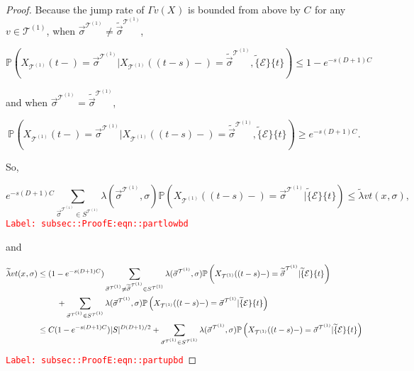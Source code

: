 \documentclass[12pt]{article}
\newcommand{\mb}{\mathbb}
\newcommand{\mc}{\mathcal}
\newcommand{\tr}{\textcolor{red}}
\newcommand{\labe}[1]{\tr{\texttt{Label: #1}}}
\newcommand{\pr}{\mb{P}}							%
\renewcommand{\v}{v}							%
\renewcommand{\S}{S}							%
\newcommand{\s}{\sigma}							%
\newcommand{\sv}{\vec{\s}}						%
\newcommand{\x}{x}								%
\renewcommand{\t}{t}							%
\renewcommand{\tt}{s}							%
\newcommand{\X}{X}								%
\newcommand{\carp}[1]{^{#1}}					%
\newcommand{\vsi}[1]{^{#1}}						%
\newcommand{\cind}[1]{_{#1}}					%
\newcommand{\tp}[1]{(#1)}						%
\newcommand{\tip}[1]{#1}						%
\newcommand{\const}{C}							%
\newcommand{\degr}{D}							%
\newcommand{\tree}{\mc{T}}						%
\newcommand{\sln}[1]{^{(#1)}}					%
\newcommand{\rate}{\lambda}						%
\newcommand{\alt}[1]{\widetilde{#1}}			%
\newcommand{\indx}[1]{_{#1}}					%
\newcommand{\evnt}{\mc{E}}						%
\newcommand{\pmap}{\Gamma}						%
\newcommand{\crate}{\alt{\lambda}}				%
\begin{document}
\begin{proof}
Because the jump rate of \(\pmap{\v}(\X\cind{}\tip{})\) is bounded from above by \(\const\indx{}\) for any \(\v\in\tree\sln{1}\),  when \(\sv\cind{}\vsi{\tree\sln{1}}\neq\alt{\sv}\cind{}\vsi{\tree\sln{1}}\), 

\[\pr\left(\X\cind{\tree\sln{1}}\tp{\t-} = \sv\cind{}\vsi{\tree\sln{1}}|\X\cind{\tree\sln{1}}\tp{(\t-\tt)-}=\alt{\sv}\cind{}\vsi{\tree\sln{1}},\alt\{\evnt\}\{\t\}\right) \leq 1-e^{-\tt(\degr+1)\const\indx{}}\]

and when \(\sv\cind{}\vsi{\tree\sln{1}}=\alt{\sv}\cind{}\vsi{\tree\sln{1}}\),

\[\pr\left(\X\cind{\tree\sln{1}}\tp{\t-} = \sv\cind{}\vsi{\tree\sln{1}}|\X\cind{\tree\sln{1}}\tp{(\t-\tt)-}=\alt{\sv}\cind{}\vsi{\tree\sln{1}},\alt\{\evnt\}\{\t\}\right) \geq e^{-\tt(\degr+1)\const\indx{}}.\]

So,

\begin{equation}
e^{-\tt(\degr+1)\const\indx{}}\sum_{\sv\cind{}\vsi{\tree\sln{1}}\in \S\carp{\tree\sln{1}}} \rate{}(\sv\cind{}\vsi{\tree\sln{1}},\s)\pr\left(\X\cind{\tree\sln{1}}\tp{(\t-\tt)-}=\sv\cind{}\vsi{\tree\sln{1}}|\alt\{\evnt\}\{\t\}\right) \leq \crate{\v}{\t}(\x\cind{}\tip{},\s),
\label{subsec::ProofE:eqn::partlowbd}
\end{equation}
\labe{subsec::ProofE:eqn::partlowbd}

and

\begin{align}
\crate{\v}{\t}(\x\cind{}\tip{},\s)&\leq (1 - e^{-\tt(\degr+1)\const\indx{}})\sum_{\sv\cind{}\vsi{\tree\sln{1}}\neq \alt{\sv}\cind{}\vsi{\tree\sln{1}} \in \S\carp{\tree\sln{1}}} \rate{}(\sv\cind{}\vsi{\tree\sln{1}},\s)\pr\left(\X\cind{\tree\sln{1}}\tp{(\t-\tt)-}=\alt{\sv}\cind{}\vsi{\tree\sln{1}}|\alt\{\evnt\}\{\t\}\right)\nonumber\\
&\hspace{24 pt} +\sum_{\sv\cind{}\vsi{\tree\sln{1}} \in \S\carp{\tree\sln{1}}} \rate{}(\sv\cind{}\vsi{\tree\sln{1}},\s)\pr\left(\X\cind{\tree\sln{1}}\tp{(\t-\tt)-}=\sv\cind{}\vsi{\tree\sln{1}}|\alt\{\evnt\}\{\t\}\right)\nonumber\\
&\leq \const\indx{}(1 - e^{-\tt(\degr+1)\const\indx{}})|\S|^{\degr(\degr+1)/2} + \sum_{\sv\cind{}\vsi{\tree\sln{1}} \in \S\carp{\tree\sln{1}}} \rate{}(\sv\cind{}\vsi{\tree\sln{1}},\s)\pr\left(\X\cind{\tree\sln{1}}\tp{(\t-\tt)-}=\sv\cind{}\vsi{\tree\sln{1}}|\alt\{\evnt\}\{\t\}\right)
\label{subsec::ProofE:eqn::partupbd}
\end{align}
\labe{subsec::ProofE:eqn::partupbd}


\end{proof}
\end{document}
